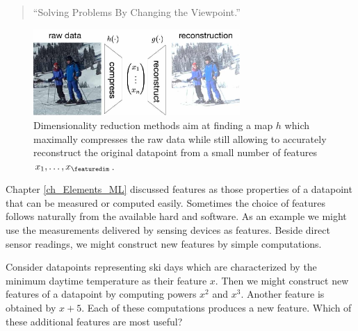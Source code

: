 \documentclass[12pt]{report}
\begin{document}
\begin{quote}
``Solving Problems By Changing the Viewpoint.''
\end{quote}

\begin{figure}[htbp]
\begin{center}
\includegraphics[width=0.7\textwidth]{DimRed.jpg}  
\end{center}
\caption{Dimensionality reduction methods aim at finding a map $h$ which maximally 
	compresses the raw data while still allowing to accurately reconstruct the original 
	datapoint from a small number of features $x_{1},\ldots,x_{\featuredim}$.}
\label{fig_dimred}
\end{figure}



Chapter \ref{ch_Elements_ML} discussed features as those properties of a datapoint that can 
be measured or computed easily. Sometimes the choice of features follows 
naturally from the available hard and software. As an example we might use 
the measurements delivered by sensing devices as features. Beside direct 
sensor readings, we might construct new features by simple computations. 

Consider datapoints representing ski days which are characterized by the 
minimum daytime temperature as their feature $x$. Then we might construct 
new features of a datapoint by computing  powers $x^{2}$ and $x^{3}$. 
Another feature is obtained by $x+5$. Each of these computations produces 
a new feature. Which of these additional features are most useful?
%
\end{document}

